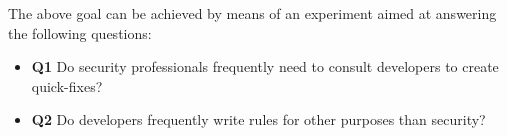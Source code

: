 The above goal can be achieved by means of an experiment aimed at answering the following questions:
\begin{itemize}
    \item \textbf{Q1} Do security professionals frequently need to consult developers to create quick-fixes?
    \item \textbf{Q2} Do developers frequently write rules for other purposes than security?
\end{itemize}

